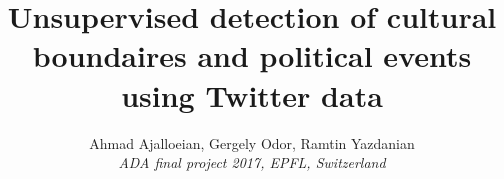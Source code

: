 \documentclass[9pt,conference,compsocconf]{IEEEtran}
\begin{document}
\title{Unsupervised detection of cultural boundaires and political events using Twitter data}

\author{
  Ahmad Ajalloeian, Gergely Odor, Ramtin Yazdanian\\
  \textit{ADA final project 2017, EPFL, Switzerland}
}
\maketitle

%      


%




\end{document}
